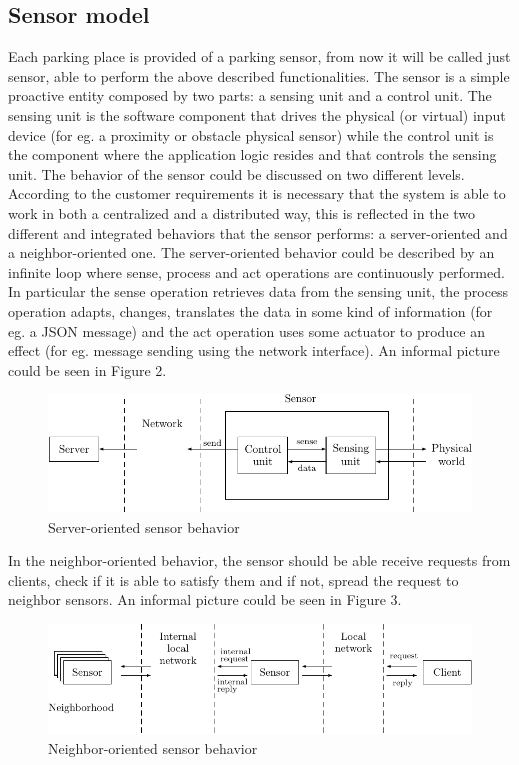 \documentclass[11pt]{article}
\begin{document}
\subsection{Sensor model}
Each parking place is provided of a parking sensor, from now it will be called just sensor, able to perform the above described functionalities. The sensor is a simple proactive entity composed by two parts: a sensing unit and a control unit. The sensing unit is the software component that drives the physical (or virtual) input device (for eg. a proximity or obstacle physical sensor) while the control unit is the component where the application logic resides and that controls the sensing unit. The behavior of the sensor could be discussed on two different levels. According to the customer requirements it is necessary that the system is able to work in both a centralized and a distributed way, this is reflected in the two different and integrated behaviors that the sensor performs: a server-oriented and a neighbor-oriented one. The server-oriented behavior could be described by an infinite loop where sense, process and act operations are continuously performed. In particular the sense operation retrieves data from the sensing unit, the process operation adapts, changes, translates the data in some kind of information (for eg. a JSON message) and the act operation uses some actuator to produce an effect (for eg. message sending using the network interface). An informal picture could be seen in Figure 2.
\begin{figure}
  \centering
	\includegraphics[scale=1]{sensor_server_oriented_behavior}
  \caption{Server-oriented sensor behavior}
\end{figure}
In the neighbor-oriented behavior, the sensor should be able receive requests from clients, check if it is able to satisfy them and if not, spread the request to neighbor sensors. An informal picture could be seen in Figure 3.
\begin{figure}
  \centering
	\includegraphics[scale=1]{sensor_neighbor_oriented_behavior}
  \caption{Neighbor-oriented sensor behavior}
\end{figure}
\end{document}
